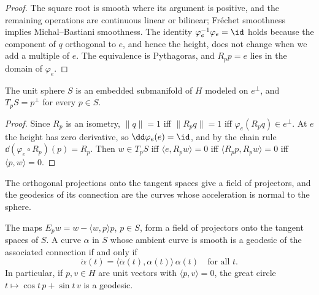 \begin{proof}
  \leanok
  The square root is smooth where its argument is positive, and the remaining operations are
  continuous linear or bilinear; Fréchet smoothness implies Michal--Bastiani smoothness. The
  identity $\varphi_e^{-1}\varphi_e = \id$ holds because the component of $q$ orthogonal to $e$,
  and hence the height, does not change when we add a multiple of $e$. The equivalence is
  Pythagoras, and $R_p p = e$ lies in the domain of $\varphi_e$.
\end{proof}

\begin{theorem}
  \label{thm:ex-sphere}
  \leanok
  The unit sphere $S$ is an embedded submanifold of $H$ modeled on $e^\perp$, and
  $T_pS = p^\perp$ for every $p \in S$.
\end{theorem}

\begin{proof}
  \leanok
  Since $R_p$ is an isometry, $\|q\| = 1$ iff $\|R_p q\| = 1$ iff
  $\varphi_e(R_p q) \in e^\perp$. At $e$ the height has zero derivative, so
  $\dd\varphi_e(e) = \id$, and by the chain rule $\dd(\varphi_e \circ R_p)(p) = R_p$. Then
  $w \in T_pS$ iff $\langle e, R_p w\rangle = 0$ iff $\langle R_p p, R_p w\rangle = 0$ iff
  $\langle p, w\rangle = 0$.
\end{proof}

The orthogonal projections onto the tangent spaces give a field of projectors, and the geodesics
of its connection are the curves whose acceleration is normal to the sphere.

\begin{theorem}
  \label{thm:ex-sphere-geodesics}
  \leanok
  The maps $E_p w = w - \langle w, p\rangle p$, $p \in S$, form a field of projectors onto
  the tangent spaces of $S$. A curve $\alpha$ in $S$ whose ambient curve is smooth is a geodesic
  of the associated connection if and only if
  \[
    \ddot\alpha(t) = \langle \ddot\alpha(t), \alpha(t)\rangle\, \alpha(t) \quad
    \text{for all } t .
  \]
  In particular, if $p, v \in H$ are unit vectors with $\langle p, v\rangle = 0$, the great
  circle $t \mapsto \cos t\, p + \sin t\, v$ is a geodesic.
\end{theorem}

